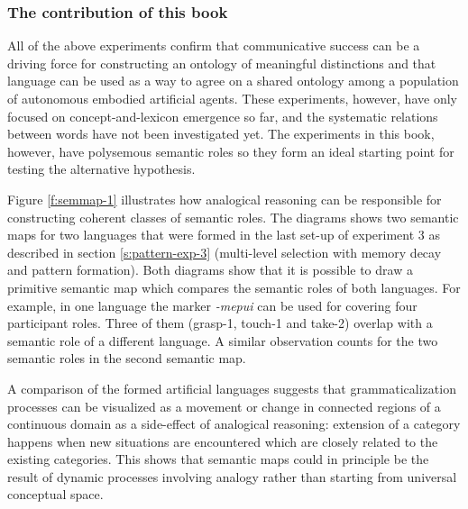\subsubsection{The contribution of this book}
All of the above experiments confirm that communicative success can be a driving force for constructing an ontology of meaningful distinctions and that language can be used as a way to agree on a shared ontology among a population of autonomous embodied artificial agents. These experiments, however, have only focused on concept-and-lexicon emergence so far, and the systematic relations between words have not been investigated yet. The experiments in this book, however, have polysemous semantic roles so they form an ideal starting point for testing the alternative hypothesis.

Figure \ref{f:semmap-1} illustrates how analogical reasoning can be responsible for constructing coherent classes of semantic roles. The diagrams shows two semantic maps for two languages that were formed in the last set-up of experiment 3 as described in section \ref{s:pattern-exp-3} (multi-level selection with memory decay and pattern formation). Both diagrams show that it is possible to draw a primitive semantic map which compares the semantic roles of both languages. For example, in one language the marker {\em -mepui} can be used for covering four participant roles. Three of them (grasp-1, touch-1 and take-2) overlap with a semantic role of a different language. A similar observation counts for the two semantic roles in the second semantic map.

A comparison of the formed artificial languages suggests that grammaticalization processes can be visualized as a movement or change in connected regions of a continuous domain as a side-effect of analogical reasoning: extension of a category happens when new situations are encountered which are closely related to the existing categories. This shows that semantic maps could in principle be the result of dynamic processes involving analogy rather than starting from universal conceptual space.

